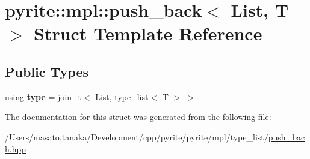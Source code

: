 \hypertarget{structpyrite_1_1mpl_1_1push__back}{}\section{pyrite\+:\+:mpl\+:\+:push\+\_\+back$<$ List, T $>$ Struct Template Reference}
\label{structpyrite_1_1mpl_1_1push__back}
\subsection*{Public Types}
\begin{DoxyCompactItemize}
\item 
\mbox{\label{structpyrite_1_1mpl_1_1push__back_a659337124738a4b3b8f2c03b594c0279}} 
using {\bfseries type} = join\+\_\+t$<$ List, \mbox{\hyperlink{structpyrite_1_1core_1_1mpl_1_1type__list}{type\+\_\+list}}$<$ T $>$ $>$
\end{DoxyCompactItemize}


The documentation for this struct was generated from the following file\+:\begin{DoxyCompactItemize}
\item 
/\+Users/masato.\+tanaka/\+Development/cpp/pyrite/pyrite/mpl/type\+\_\+list/\mbox{\hyperlink{push__bach_8hpp}{push\+\_\+bach.\+hpp}}\end{DoxyCompactItemize}
